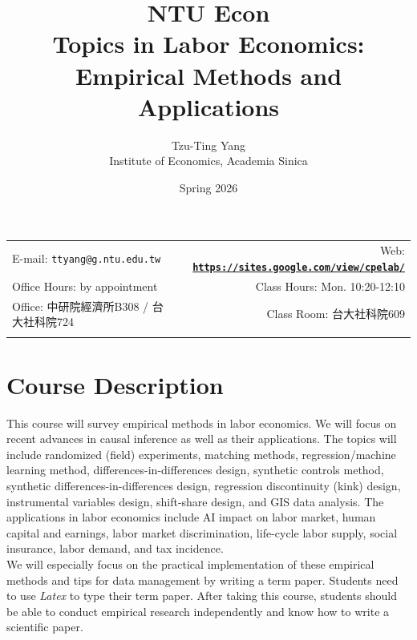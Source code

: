 \documentclass[11pt]{article}
\title{NTU Econ \\ Topics in Labor Economics: Empirical Methods and Applications}
\author{Tzu-Ting Yang  \\ Institute of Economics, Academia Sinica}
\date{Spring 2026}
\newcommand{\blankline}{\quad\pagebreak[2]}
\begin{document}
\maketitle

\blankline

\begin{tabular*}{1.03\textwidth}{@{\extracolsep{\fill}}lr}


  E-mail: \texttt{ttyang@g.ntu.edu.tw} & Web: \href{https://sites.google.com/view/cpelab/}{\tt\bf https://sites.google.com/view/cpelab/}  \\

 Office Hours: by appointment  &  Class Hours: Mon. 10:20-12:10 \\


Office: 中研院經濟所B308 / 台大社科院724 & Class Room: 台大社科院609 \\

&  \\
\hline
\end{tabular*}

\vspace{10 mm}

\section*{Course Description}
This course will survey empirical methods in labor economics. We will focus on recent advances in causal inference as well as their applications. The topics will include randomized (field) experiments, matching methods, regression/machine learning method, differences-in-differences design, synthetic controls method, synthetic differences-in-differences design, regression discontinuity (kink) design, instrumental variables design, shift-share design, and GIS data analysis. The applications in labor economics include AI impact on labor market, human capital and earnings, labor market discrimination, life-cycle labor supply, social insurance, labor demand, and tax incidence.  \\

We will especially focus on the practical implementation of these empirical methods and tips for data management by writing a term paper. Students need to use \textit{Latex} to type their term paper. After taking this course, students should be able to conduct empirical research independently and know how to write a scientific paper.
\end{document}
